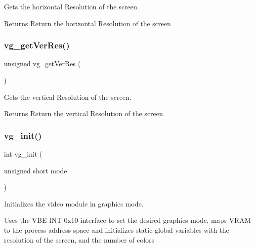 Gets the horizontal Resolution of the screen. 

\begin{DoxyReturn}{Returns}
Return the horizontal Resolution of the screen 
\end{DoxyReturn}
\hypertarget{group__video__gr_gaab8200f7947926322b6dd6fa7c6da1e1}{}\label{group__video__gr_gaab8200f7947926322b6dd6fa7c6da1e1} 
\subsubsection{\texorpdfstring{vg\+\_\+get\+Ver\+Res()}{vg\_getVerRes()}}
{\footnotesize\ttfamily unsigned vg\+\_\+get\+Ver\+Res (\begin{DoxyParamCaption}{ }\end{DoxyParamCaption})}



Gets the vertical Resolution of the screen. 

\begin{DoxyReturn}{Returns}
Return the vertical Resolution of the screen 
\end{DoxyReturn}
\hypertarget{group__video__gr_ga7d19c24f10ca7bfb2c7b8f9e12d4dc6f}{}\label{group__video__gr_ga7d19c24f10ca7bfb2c7b8f9e12d4dc6f} 
\subsubsection{\texorpdfstring{vg\+\_\+init()}{vg\_init()}}
{\footnotesize\ttfamily int vg\+\_\+init (\begin{DoxyParamCaption}\item[{unsigned short}]{mode }\end{DoxyParamCaption})}



Initializes the video module in graphics mode. 

Uses the V\+BE I\+NT 0x10 interface to set the desired graphics mode, maps V\+R\+AM to the process\textquotesingle{} address space and initializes static global variables with the resolution of the screen, and the number of colors


